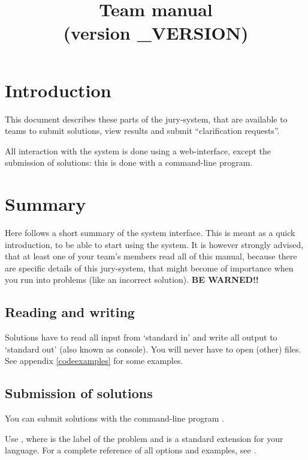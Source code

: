 

\usepackage[english]{babel}

\title{Team manual \DOMjudge\\(version \DOMJUDGE_VERSION)}



\domjudgetitlepage

\newpage
\tableofcontents

\newpage
\section{Introduction}

This document describes these parts of the \DOMjudge jury-system, that
are available to teams to submit solutions, view results and submit
``clarification requests''.

All interaction with the system is done using a web-interface, except
the submission of solutions: this is done with a command-line program.

\section{Summary}

Here follows a short summary of the system interface. This is meant as
a quick introduction, to be able to start using the system. It is
however strongly advised, that at least one of your team's members
read all of this manual, because there are specific details of this
jury-system, that might become of importance when you run into
problems (like an incorrect solution). \textbf{BE WARNED!!}

\subsection{Reading and writing}

Solutions have to read all input from `standard in' and write all
output to `standard out' (also known as console). You will never have
to open (other) files. See appendix \ref{codeexamples} for some
examples.

\subsection{Submission of solutions}

You can submit solutions with the command-line program .

Use , where  is the
label of the problem and  is a standard extension for
your language.  For a complete reference of all options and examples,
see .

